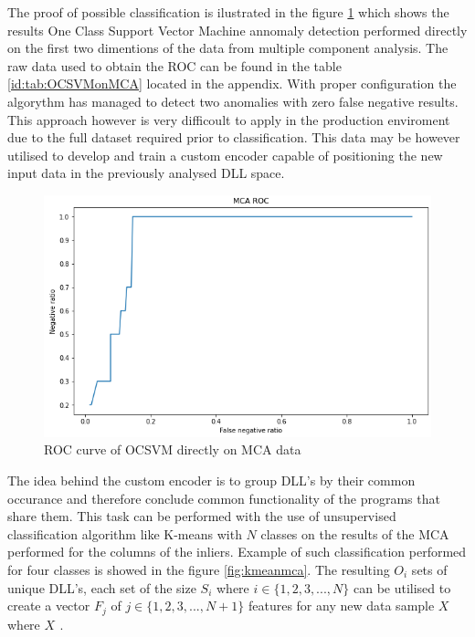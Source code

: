 \documentclass[a4paper,twoside,12pt]{book}
\begin{document}
The proof of possible classification is ilustrated in the figure \ref{fig:mcaroc} which shows the 
results One Class Support Vector Machine annomaly detection performed directly on the first two dimentions 
of the data from multiple component analysis. The raw data used to obtain the ROC can be found in the table
\ref{id:tab:OCSVMonMCA} located in the appendix. With proper configuration the algorythm has managed to detect 
two anomalies with zero false negative results. This approach however is very difficoult to apply in the 
production enviroment due to the full dataset required prior to classification. This data may be however 
utilised to develop and train a custom encoder capable of positioning the new input data in the previously 
analysed DLL space.  

\begin{figure}
	\centering
	\includegraphics[scale=0.9]{images/MCAROC}
	\caption{ROC curve of OCSVM directly on MCA data}
	\label{fig:mcaroc}
 \end{figure}


The idea behind the custom encoder is to group DLL's by their common occurance and therefore
conclude common functionality of the programs that share them. This task can be performed
with the use of unsupervised classification algorithm like K-means with $\mathit{N}$ classes 
on the results of the MCA performed for the columns of the inliers. Example of such classification
performed for four classes is showed in the figure \ref{fig:kmeanmca}. The resulting 
$\mathit{O_{i}}$ sets of unique DLL's, each set of the size $\mathit{S_{i}}$  where 
$\mathit{i\in\{1, 2, 3,..., N\}}$  can be utilised to create a 
vector $\mathit{F_{j}}$ of $\mathit{j\in\{1, 2, 3, ..., N + 1\}}$ features for any new 
data sample $\mathit{X}$ where $\mathit{X_{}}$ . 
\end{document}

